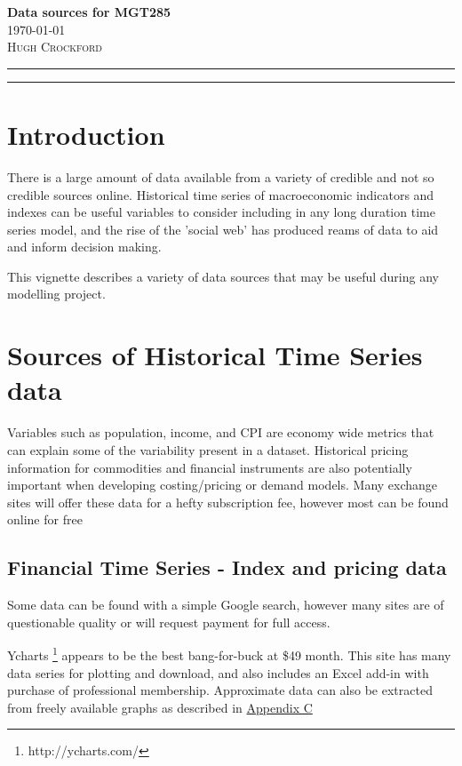 \documentclass[11pt]{article}
\begin{document}
\begin{flushleft}
	\vspace*{0.3in}
	\Huge \textbf{Data sources for MGT285}\\
	\Large \today \\
	\vspace{0.25in}
	\textsc{Hugh Crockford}
	\vspace{0.25in}
	\hrule
	\hrule
	\tableofcontents
\end{flushleft}

	\vspace{0.75in}

\newpage
\section{Introduction}
	There is a large amount of data available from a variety of credible and not so credible sources online.
	Historical time series of macroeconomic indicators and indexes can be useful variables to consider including in any long duration time series model, and the rise of the 'social web' has produced reams of data to aid and inform decision making.


	This vignette describes a variety of data sources that may be useful during any modelling project.

\section{Sources of Historical Time Series data}
	Variables such as population, income, and CPI are economy wide metrics that can explain some of the variability present in a dataset.
	Historical pricing information for commodities and financial instruments are also potentially important when developing costing/pricing or demand models.
	Many exchange sites will offer these data for a hefty subscription fee, however most can be found online for free

	\subsection{Financial Time Series - Index and pricing data}
	Some data can be found with a simple Google search, however many sites are of questionable quality or will request payment for full access.


	Ycharts \footnote{http://ycharts.com/} appears to be the best bang-for-buck at \$49 month. 
	This site has many data series for plotting and download, and also includes an Excel add-in with purchase of professional membership.
	Approximate data can also be extracted from freely available graphs as described in \hyperref[graph]{Appendix C}
\end{document}
